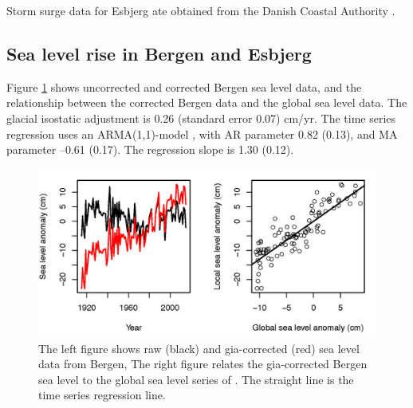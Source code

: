 \documentclass[draft,linenumbers]{agujournal}
\begin{document}
Storm surge data for Esbjerg ate obtained from the Danish Coastal Authority \citep{sealevel2012}.

\subsection{Sea level rise in Bergen and Esbjerg}

Figure \ref{fig:bergenobs} shows uncorrected and corrected Bergen sea level data, and the relationship between the corrected Bergen data and the global sea level data. The glacial isostatic adjustment is 0.26 (standard error 0.07) cm/yr. The time series regression uses an ARMA(1,1)-model \citep{boxjenkins}, with AR parameter 0.82 (0.13), and MA parameter --0.61 (0.17). The regression slope is 1.30 (0.12).

\begin{figure}[!hbpt]
\begin{center}
\includegraphics[width=0.75\linewidth]{bergenfit_edit.png}
\caption{ The left figure shows raw (black) and gia-corrected (red) sea level data from Bergen, The right figure relates the gia-corrected Bergen sea level to the global sea level series of \citet{csiro}. The straight line is the time series regression line.}
\label{fig:bergenobs}
\end{center}
\end{figure}
\end{document}
